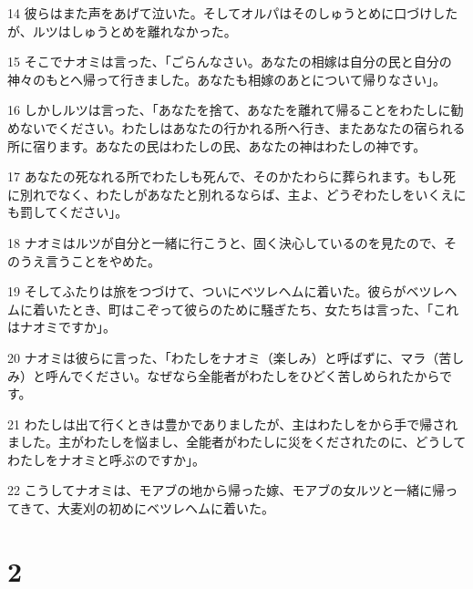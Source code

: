 \par 14 彼らはまた声をあげて泣いた。そしてオルパはそのしゅうとめに口づけしたが、ルツはしゅうとめを離れなかった。
\par 15 そこでナオミは言った、「ごらんなさい。あなたの相嫁は自分の民と自分の神々のもとへ帰って行きました。あなたも相嫁のあとについて帰りなさい」。
\par 16 しかしルツは言った、「あなたを捨て、あなたを離れて帰ることをわたしに勧めないでください。わたしはあなたの行かれる所へ行き、またあなたの宿られる所に宿ります。あなたの民はわたしの民、あなたの神はわたしの神です。
\par 17 あなたの死なれる所でわたしも死んで、そのかたわらに葬られます。もし死に別れでなく、わたしがあなたと別れるならば、主よ、どうぞわたしをいくえにも罰してください」。
\par 18 ナオミはルツが自分と一緒に行こうと、固く決心しているのを見たので、そのうえ言うことをやめた。
\par 19 そしてふたりは旅をつづけて、ついにベツレヘムに着いた。彼らがベツレヘムに着いたとき、町はこぞって彼らのために騒ぎたち、女たちは言った、「これはナオミですか」。
\par 20 ナオミは彼らに言った、「わたしをナオミ（楽しみ）と呼ばずに、マラ（苦しみ）と呼んでください。なぜなら全能者がわたしをひどく苦しめられたからです。
\par 21 わたしは出て行くときは豊かでありましたが、主はわたしをから手で帰されました。主がわたしを悩まし、全能者がわたしに災をくだされたのに、どうしてわたしをナオミと呼ぶのですか」。
\par 22 こうしてナオミは、モアブの地から帰った嫁、モアブの女ルツと一緒に帰ってきて、大麦刈の初めにベツレヘムに着いた。

\chapter{2}

